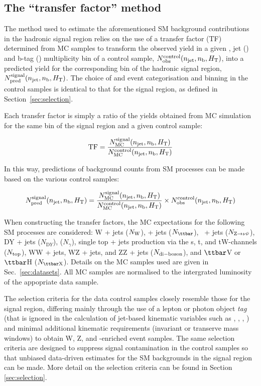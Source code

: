 \subsection{The ``transfer factor'' method}
\label{sec:ewk-method}

The method used to estimate the aforementioned SM background
contributions in the hadronic signal region relies on the use of a
transfer factor (TF) determined from MC samples to transform the
observed yield in a given \scalht, jet (\njet) and b-tag (\nb)
multiplicity bin of a control sample, $N_{\textrm{obs}}^{\rm
  control}(n_{\text{jet}},n_{\text{b}},\mbox{$H_\text{T}$})$, into a predicted yield for the
corresponding bin of the hadronic signal region, $N_{\textrm{pred}}^{\rm
  signal}(n_{\text{jet}},n_{\text{b}},\mbox{$H_\text{T}$})$. The choice of \njet and \nb event
categorisation and \scalht binning in the control samples is identical
to that for the signal region, as defined in
Section~\ref{sec:selection}. 

Each transfer factor is simply a ratio of the yields obtained from MC
simulation for the same bin of the signal region and a given control
sample:

\begin{equation}
  \label{equ:tf-ratio}
  {\rm TF} = \frac{N_{\rm MC}^{\rm signal}(n_{\text{jet}},n_{\text{b}},\mbox{$H_\text{T}$})}{N_{\rm
      MC}^{\rm control}(n_{\text{jet}},n_{\text{b}},\mbox{$H_\text{T}$})} 
\end{equation}

In this way, predictions of background counts from SM processes can be
made based on the various control samples:

\begin{equation}
  \label{equ:pred-method}
  N_{\textrm{pred}}^{\rm signal}(n_{\text{jet}},n_{\text{b}},\mbox{$H_\text{T}$}) = \frac{N_{\rm MC}^{\rm
      signal}(n_{\text{jet}},n_{\text{b}},\mbox{$H_\text{T}$})}{N_{\rm MC}^{\rm
      control}(n_{\text{jet}},n_{\text{b}},\mbox{$H_\text{T}$})} \times N_{\textrm{obs}}^{\rm
    control}(n_{\text{jet}},n_{\text{b}},\mbox{$H_\text{T}$})   
\end{equation}

When constructing the transfer factors, the MC expectations for the
following SM processes are considered: W + jets ($N_{\rm W}$), \ttbar
+ jets ($N_{\ttbar}$), \znunu\ + jets ($N_{{\text Z} \rightarrow \nu\bar{\nu}}$), DY + jets
($N_{\mathrm DY}$), \gj ($N_\gamma$), single top + jets
production via the s, t, and tW-channels ($N_{\rm top}$), WW +
jets, WZ + jets, and ZZ + jets ($N_{\rm di-boson}$), and $\ttbar$V or
$\ttbar$H ($N_{\rm {\ttbar}X}$). Details on the MC
samples used are given in Sec.~\ref{sec:datasets}. All MC samples
are normalised to the intergrated luminosity of the appopriate data
sample.

The selection criteria for the data control samples closely resemble
those for the signal region, differing mainly through the use of a
lepton or photon object {\it tag} (that is ignored in the calculation
of jet-based kinematic variables such as \scalht, \mht, \alphat, \etc)
and minimal additional kinematic requirements (\eg invariant or
transerve mass windows) to obtain W, Z, and \ttbar-enriched event
samples. The same selection criteria are designed to suppress signal
contamination in the control samples so that unbiased data-driven
estimates for the SM backgrounds in the signal region can be
made. More detail on the selection criteria can be found in Section
\ref{sec:selection}.

